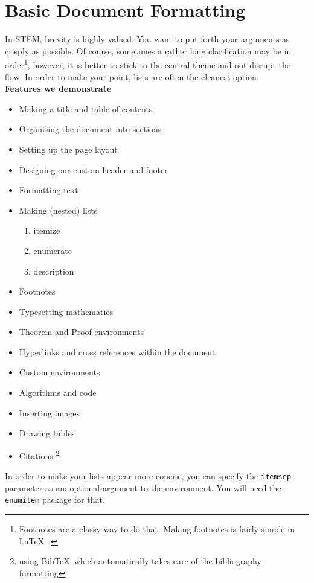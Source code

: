 \documentclass[10pt]{article}
\theoremstyle{remark}
\begin{document}
\section{Basic Document Formatting}
\label{formatting}
\renewcommand{\baselinestretch}{0.5}
In STEM, brevity is highly valued. You want to put forth your arguments as crisply as possible. Of course, sometimes a rather long clarification may be in order\footnote{Footnotes are a classy way to do that. Making footnotes is fairly simple in \LaTeX\ .}, however, it is better to stick to the central theme and not disrupt the flow. In order to make your point, lists are often the cleanest option.\\
\renewcommand{\baselinestretch}{1}
\vspace{8pt}
\setlength{\parindent}{0em}\large{\textbf{ Features we demonstrate}}
\normalsize
\begin{itemize}[itemsep=-1pt]
	\item Making a title and table of contents
	\item Organising the document into sections
	\item Setting up the page layout
	\item Designing our custom header and footer
	\item Formatting text
	\item Making (nested) lists
	\begin{enumerate}[noitemsep]
		\item itemize
		\item enumerate 
		\item description
	\end{enumerate}	
	\item Footnotes
	\item Typesetting mathematics
	\item Theorem and Proof environments
	\item Hyperlinks and cross references within the document 
	\item Custom environments
	\item Algorithms and code
	\item Inserting images
	\item Drawing tables
	\item \renewcommand{\thefootnote}{\fnsymbol{footnote}}
			Citations \footnote{using Bib\TeX\, which automatically takes care of the bibliography formatting}
\end{itemize}	
In order to make your lists appear more concise, you can specify the \verb!itemsep! parameter as am optional argument to the environment. You will need the \verb!enumitem! package for that.
\end{document}

